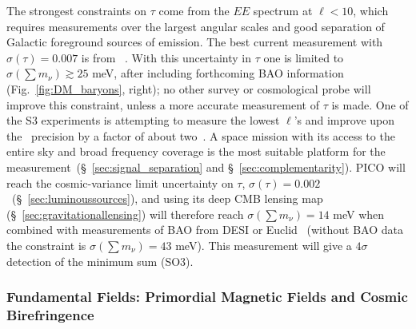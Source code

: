 \documentclass[PICOReport.tex]{subfiles}
\begin{document}
The strongest constraints on $\tau$ come from the $EE$ spectrum at $\ell < 10$, which requires measurements over the largest angular scales  and good separation of Galactic foreground sources of emission. The best current measurement with $\sigma({\tau}) = 0.007$ is from \planck~\cite{Planck2018_VI}. With this uncertainty in $\tau$ one is limited to  $\sigma(\sum m_\nu) \gtrsim 25$ meV, after including forthcoming \ac{BAO} information (Fig.~\ref{fig:DM_baryons}, right); no other survey or cosmological probe will improve this constraint, unless a more accurate measurement of $\tau$ is made. One of the S3 experiments is attempting to measure the lowest $\ell$'s and improve upon the \planck\ precision by a factor of about two~\citep{class}. A space mission with its access to the entire sky and broad frequency coverage is the most suitable platform for the measurement~(\S~\ref{sec:signal_separation} and \S~\ref{sec:complementarity}). PICO will reach the cosmic-variance limit uncertainty on $\tau$, $\sigma(\tau) = 0.002$~(\S~\ref{sec:luminoussources}), and using its deep CMB lensing map (\S~\ref{sec:gravitationallensing}) will therefore reach $\sigma(\sum m_\nu) = 14$ meV when combined with measurements of \ac{BAO} from DESI or Euclid~\cite{Levi:2013gra} (without \ac{BAO} data the constraint is $\sigma(\sum m_\nu) = 43$ meV).  This measurement will give a $4\sigma$ detection of the minimum sum (SO3). 



\subsubsection{Fundamental Fields: Primordial Magnetic Fields and Cosmic Birefringence}
\end{document}
